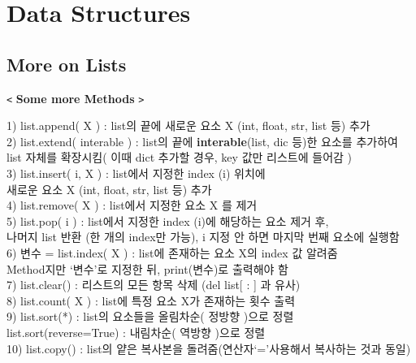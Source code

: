 \documentclass[11pt,a4paper]{article}
\begin{document}
\section{\LARGE\textbf{Data Structures}}
\subsection{\Large\textbf{More on Lists}}
\texttt{<} \Large\textbf{Some more Methods} \texttt{>}\\
\normalsize
\begin{spacing}{1.5}
\hspace*{2em}1) list.append( X ) : list의 끝에 새로운 요소 X (int, float, str, list 등) 추가\\
\hspace*{2em}2) list.extend( interable ) : list의 끝에 \textbf{interable}(list, dic 등)한 요소를 추가하여\\
\hspace*{3em}list 자체를 확장시킴( 이때 dict 추가할 경우, key 값만 리스트에 들어감 )\\
\hspace*{2em}3) list.insert( i, X ) : list에서 지정한 index (i) 위치에\\
\hspace*{3em}새로운 요소 X (int, float, str, list 등) 추가\\
\hspace*{2em}4) list.remove( X ) : list에서 지정한 요소 X 를 제거\\
\hspace*{2em}5) list.pop( i ) : list에서 지정한 index (i)에 해당하는 요소 제거 후,\\
\hspace*{3em}나머지 list 반환 (한 개의 index만 가능), i 지정 안 하면 마지막 번째 요소에 실행함\\
\hspace*{2em}6) 변수 = list.index( X ) : list에 존재하는 요소 X의 index 값 알려줌\\
\hspace*{3em}Method지만 `변수'로 지정한 뒤, print(변수)로 출력해야 함\\
\hspace*{2em}7) list.clear() : 리스트의 모든 항목 삭제 (del  list[ : ] 과 유사)\\
\hspace*{2em}8) list.count( X ) : list에 특정 요소 X가 존재하는 횟수 출력\\
\hspace*{2em}9) list.sort(*) : list의 요소들을 올림차순( 정방향 )으로 정렬\\
\hspace*{3em}list.sort(reverse=True) : 내림차순( 역방향 )으로 정렬\\
\hspace*{2em}10) list.copy() : list의 얕은 복사본을 돌려줌(연산자`='사용해서 복사하는 것과 동일)
\end{spacing}
\end{document}
